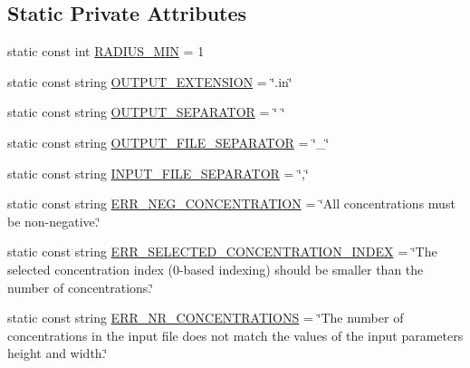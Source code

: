 \subsection*{\-Static \-Private \-Attributes}
\begin{DoxyCompactItemize}
\item 
static const int \hyperlink{classmultiscale_1_1video_1_1PolarCsvToInputFilesConverter_aeb8eeef6a83cd99ebfc47053a1ec99a7}{\-R\-A\-D\-I\-U\-S\-\_\-\-M\-I\-N} = 1
\item 
static const string \hyperlink{classmultiscale_1_1video_1_1PolarCsvToInputFilesConverter_a56aba7dfbcf26587bd62f33549f2ff9d}{\-O\-U\-T\-P\-U\-T\-\_\-\-E\-X\-T\-E\-N\-S\-I\-O\-N} = \char`\"{}.in\char`\"{}
\item 
static const string \hyperlink{classmultiscale_1_1video_1_1PolarCsvToInputFilesConverter_ad447c289e9cede69b3726cf21bfd9170}{\-O\-U\-T\-P\-U\-T\-\_\-\-S\-E\-P\-A\-R\-A\-T\-O\-R} = \char`\"{} \char`\"{}
\item 
static const string \hyperlink{classmultiscale_1_1video_1_1PolarCsvToInputFilesConverter_ad0594e8ac5379831ae98da51f099fe20}{\-O\-U\-T\-P\-U\-T\-\_\-\-F\-I\-L\-E\-\_\-\-S\-E\-P\-A\-R\-A\-T\-O\-R} = \char`\"{}\-\_\-\char`\"{}
\item 
static const string \hyperlink{classmultiscale_1_1video_1_1PolarCsvToInputFilesConverter_a50776983508e07e012e8af56f5432791}{\-I\-N\-P\-U\-T\-\_\-\-F\-I\-L\-E\-\_\-\-S\-E\-P\-A\-R\-A\-T\-O\-R} = \char`\"{},\char`\"{}
\item 
static const string \hyperlink{classmultiscale_1_1video_1_1PolarCsvToInputFilesConverter_a8d373be02d579bb5d2408f3a3bbd198a}{\-E\-R\-R\-\_\-\-N\-E\-G\-\_\-\-C\-O\-N\-C\-E\-N\-T\-R\-A\-T\-I\-O\-N} = \char`\"{}\-All concentrations must be non-\/negative.\char`\"{}
\item 
static const string \hyperlink{classmultiscale_1_1video_1_1PolarCsvToInputFilesConverter_abfe6222398ec34130ed689d190f85ea6}{\-E\-R\-R\-\_\-\-S\-E\-L\-E\-C\-T\-E\-D\-\_\-\-C\-O\-N\-C\-E\-N\-T\-R\-A\-T\-I\-O\-N\-\_\-\-I\-N\-D\-E\-X} = \char`\"{}\-The selected concentration index (0-\/based indexing) should be smaller than the number of concentrations.\char`\"{}
\item 
static const string \hyperlink{classmultiscale_1_1video_1_1PolarCsvToInputFilesConverter_a9b671949301bdb73d0b232be0b29c23e}{\-E\-R\-R\-\_\-\-N\-R\-\_\-\-C\-O\-N\-C\-E\-N\-T\-R\-A\-T\-I\-O\-N\-S} = \char`\"{}\-The number of concentrations in the input file does not match the values of the input parameters height and width.\char`\"{}

\end{DoxyCompactItemize}

